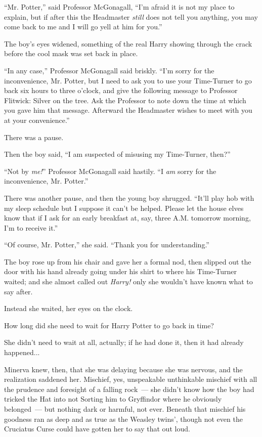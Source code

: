 ``Mr. Potter,'' said Professor McGonagall, ``I'm afraid it is not my place to explain, but if after this the Headmaster \emph{still} does not tell you anything, you may come back to me and I will go yell at him for you.''

The boy's eyes widened, something of the real Harry showing through the crack before the cool mask was set back in place.

``In any case,'' Professor McGonagall said briskly. ``I'm sorry for the inconvenience, Mr. Potter, but I need to ask you to use your Time-Turner to go back six hours to three o'clock, and give the following message to Professor Flitwick: Silver on the tree. Ask the Professor to note down the time at which you gave him that message. Afterward the Headmaster wishes to meet with you at your convenience.''

There was a pause.

Then the boy said, ``I am suspected of misusing my Time-Turner, then?''

``Not by \emph{me!}'' Professor McGonagall said hastily. ``I \emph{am} sorry for the inconvenience, Mr. Potter.''

There was another pause, and then the young boy shrugged. ``It'll play hob with my sleep schedule but I suppose it can't be helped. Please let the house elves know that if I ask for an early breakfast at, say, three A.M. tomorrow morning, I'm to receive it.''

``Of course, Mr. Potter,'' she said. ``Thank you for understanding.''

The boy rose up from his chair and gave her a formal nod, then slipped out the door with his hand already going under his shirt to where his Time-Turner waited; and she almost called out \emph{Harry!} only she wouldn't have known what to say after.

Instead she waited, her eyes on the clock.

How long did she need to wait for Harry Potter to go back in time?

She didn't need to wait at all, actually; if he had done it, then it had already happened...

Minerva knew, then, that she was delaying because she was nervous, and the realization saddened her. Mischief, yes, unspeakable unthinkable mischief with all the prudence and foresight of a falling rock~--- she didn't know how the boy had tricked the Hat into not Sorting him to Gryffindor where he obviously belonged~--- but nothing dark or harmful, not ever. Beneath that mischief his goodness ran as deep and as true as the Weasley twins', though not even the Cruciatus Curse could have gotten her to say that out loud.

